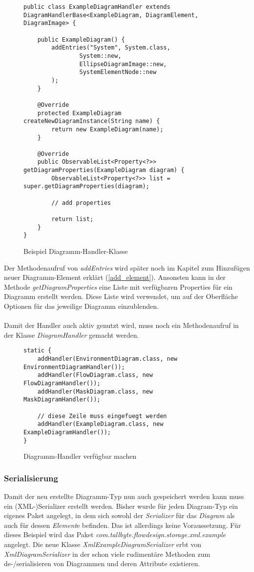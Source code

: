 \begin{figure}[H]
	\centering
	\begin{lstlisting}
public class ExampleDiagramHandler extends DiagramHandlerBase<ExampleDiagram, DiagramElement, DiagramImage> {

    public ExampleDiagram() {
        addEntries("System", System.class,
                System::new,
                EllipseDiagramImage::new,
                SystemElementNode::new
        );
    }

    @Override
    protected ExampleDiagram createNewDiagramInstance(String name) {
        return new ExampleDiagram(name);
    }
    
    @Override
    public ObservableList<Property<?>> getDiagramProperties(ExampleDiagram diagram) {
        ObservableList<Property<?>> list = super.getDiagramProperties(diagram);

		// add properties

        return list;
    }
}
	\end{lstlisting}
	\label{diagram_handler}
	\caption{Beispiel Diagramm-Handler-Klasse}
\end{figure}
Der Methodenaufruf von \textit{addEntries} wird später noch im Kapitel zum Hinzufügen neuer Diagramm-Element
erklärt (\ref{add_element}). Ansonsten kann in der Methode \textit{getDiagramProperties} eine Liste mit verfügbaren
Properties für ein Diagramm erstellt werden. Diese Liste wird verwendet, um auf der Oberfläche Optionen für das
jeweilige Diagramm einzublenden.
\\
\\
Damit der Handler auch aktiv genutzt wird, muss noch ein Methodenaufruf in der Klasse \textit{DiagramHandler} gemacht
werden.

\begin{figure}[H]
	\centering
	\begin{lstlisting}
static {
    addHandler(EnvironmentDiagram.class, new EnvironmentDiagramHandler());
    addHandler(FlowDiagram.class, new FlowDiagramHandler());
    addHandler(MaskDiagram.class, new MaskDiagramHandler());
        
    // diese Zeile muss eingefuegt werden
    addHandler(ExampleDiagram.class, new ExampleDiagramHandler());
}
	\end{lstlisting}
	\label{diagram_handler}
	\caption{Diagramm-Handler verfügbar machen}
\end{figure}
\subsubsection{Serialisierung}
\label{expl_code_serialize_diagram}
Damit der neu erstellte Diagramm-Typ nun auch gespeichert werden kann muss ein (XML-)Serializer erstellt
werden. Bisher wurde für jeden Diagram-Typ ein eigenes Paket angelegt, in dem sich sowohl der 
\textit{Serializer} für das \textit{Diagram} als auch für dessen \textit{Element}e befinden. Das ist
allerdings keine Voraussetzung. 
Für dieses Beispiel wird das Paket \textit{com.tallbyte.flowdesign.storage.xml.example} angelegt.
Die neue Klasse \textit{XmlExampleDiagramSerializer} erbt von \textit{XmlDiagramSerializer} in der
schon viele rudimentäre Methoden zum de-/serialisieren von Diagrammen und deren Attribute existieren.


